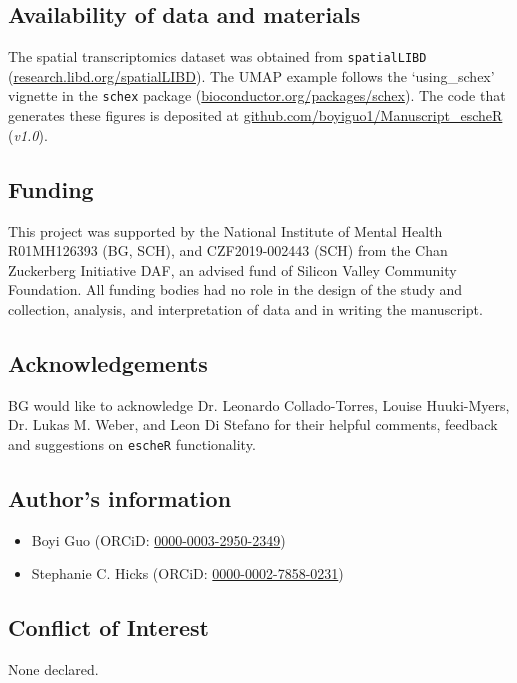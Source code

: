 \documentclass[10pt,twocolumn]{article}
\begin{document}
\subsection*{Availability of data and materials}
The spatial transcriptomics dataset was obtained from \texttt{spatialLIBD} (\href{http://research.libd.org/spatialLIBD}{research.libd.org/spatialLIBD}). The UMAP example follows the `using\_schex' vignette in the \texttt{schex} package (\href{https://www.bioconductor.org/packages/schex}{bioconductor.org/packages/schex}). The code that generates these figures is deposited at \href{https://github.com/boyiguo1/Manuscript_escheR}{github.com/boyiguo1/Manuscript\_escheR} (\textit{v1.0}).


\subsection*{Funding}
This project was supported by the National Institute of Mental Health R01MH126393 (BG, SCH), and CZF2019-002443 (SCH) from the Chan Zuckerberg Initiative DAF, an advised fund of Silicon Valley Community Foundation. All funding bodies had no role in the design of the study and collection, analysis, and interpretation of data and in writing the manuscript.

\subsection*{Acknowledgements}
BG would like to acknowledge Dr. Leonardo Collado-Torres, Louise Huuki-Myers, Dr. Lukas M. Weber, and Leon Di Stefano for their helpful comments, feedback and suggestions on \texttt{escheR} functionality.



\subsection*{Author’s information}

\begin{itemize}[nosep]
    \item Boyi Guo (ORCiD: \href{https://orcid.org/0000-0003-2950-2349}{0000-0003-2950-2349})
    \item Stephanie C. Hicks (ORCiD: \href{https://orcid.org/0000-0002-7858-0231}{0000-0002-7858-0231})
\end{itemize} 

\subsection*{Conflict of Interest} 
None declared.
\end{document}
